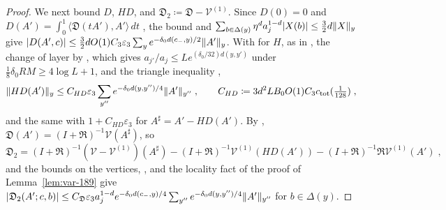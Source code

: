\documentclass[11pt]{preprint}
\DeclarePairedDelimiter{\abs}{\lvert}{\rvert}
\DeclarePairedDelimiter{\norm}{\lVert}{\rVert}
\numberwithin{equation}{section}
\theoremstyle{definition}
\theoremstyle{remark}
\theoremstyle{plain}
\begin{document}
\begin{proof}
We next bound $D$, $HD$, and $\mathfrak D_2 \coloneqq \mathfrak D - \mathcal V^{(1)}$. Since $D(0) = 0$ and $D(A') = \int_0^1\langle\mathfrak D(tA'), A'\rangle\,dt$ \cite[(63)--(64)]{BalabanVAR}, the bound \cite[(73)]{BalabanVAR} and $\sum_{b \in \Delta(y)}\eta^da_j^{1-d}\abs{X(b)} \leq \frac32d\norm X_y$ give $\abs{D(A', c)} \leq \frac32dO(1)C_3\varepsilon_3\sum_ye^{-\delta_0d(c_-,y)/2}\norm{A'}_y$. With \cite[(3.133)]{BalabanPBG} for $H$, as in \cite[(69), (86)]{BalabanVAR}, the change of layer by \cite[(2.60)]{BalabanPRT2}, which gives $a_{j'}/a_j \leq Le^{(\delta_0/32)d(y,y')}$ under $\frac18\delta_0RM \geq 4\log L + 1$, and the triangle inequality \cite[(2.54)]{BalabanPRT2},
\begin{equation*}
    \norm{HD(A')}_y \leq C_{HD}\varepsilon_3\sum_{y''}e^{-\delta_0d(y,y'')/4}\norm{A'}_{y''}\;,
    \qquad
    C_{HD} \coloneqq 3d^2LB_0O(1)C_3c_{\mathrm{tot}}(\tfrac1{128})\;,
\end{equation*}
and the same with $1 + C_{HD}\varepsilon_3$ for $A^\sharp = A' - HD(A')$. By \cite[(70)]{BalabanVAR}, $\mathfrak D(A') = (I + \mathfrak R)^{-1}\mathcal V(A^\sharp)$, so
\begin{equation*}
    \mathfrak D_2 = (I + \mathfrak R)^{-1}(\mathcal V - \mathcal V^{(1)})(A^\sharp) - (I + \mathfrak R)^{-1}\mathcal V^{(1)}(HD(A')) - (I + \mathfrak R)^{-1}\mathfrak R\mathcal V^{(1)}(A')\;,
\end{equation*}
and the bounds on the vertices, \cite[(69), (71)]{BalabanVAR}, and the locality fact of the proof of Lemma~\ref{lem:var-189} give $\abs{\mathfrak D_2(A'; c, b)} \leq C_{\mathfrak D}\varepsilon_3a_j^{1-d}e^{-\delta_0d(c_-,y)/4}\sum_{y''}e^{-\delta_0d(y,y'')/4}\norm{A'}_{y''}$ for $b \in \Delta(y)$.


\end{proof}
\end{document}
